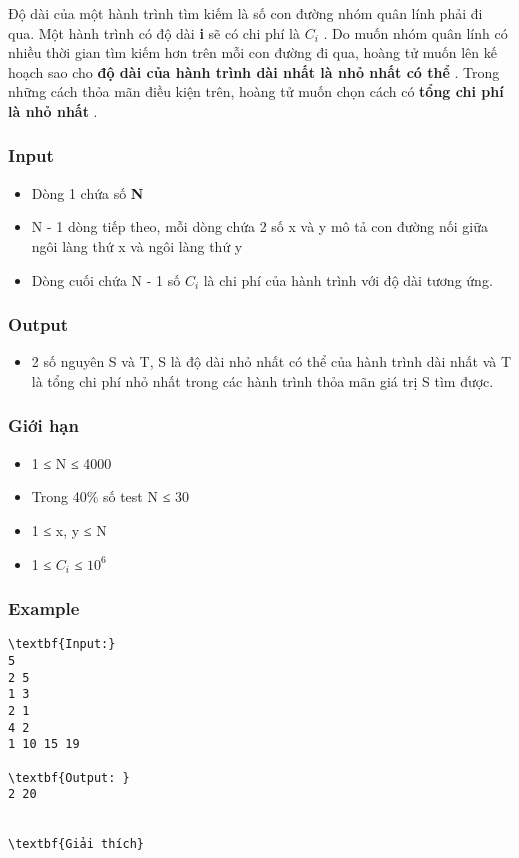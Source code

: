Độ dài của một hành trình tìm kiếm là số con đường nhóm quân lính phải đi qua. Một hành trình có độ dài \textbf{ i } sẽ có chi phí là \textbf{ $C_{i}$} . Do muốn nhóm quân lính có nhiều thời gian tìm kiếm hơn trên mỗi con đường đi qua, hoàng tử muốn lên kế hoạch sao cho \textbf{ độ dài của hành trình dài nhất là nhỏ nhất có thể } . Trong những cách thỏa mãn điều kiện trên, hoàng tử muốn chọn cách có \textbf{ tổng chi phí là nhỏ nhất } .

\subsubsection{Input}
\begin{itemize}
	\item Dòng 1 chứa số \textbf{ N }
	\item N - 1 dòng tiếp theo, mỗi dòng chứa 2 số x và y mô tả con đường nối giữa ngôi làng thứ x và ngôi làng thứ y
	\item Dòng cuối chứa N - 1 số \textbf{ $C_{i}$} là chi phí của hành trình với độ dài tương ứng.
\end{itemize}

\subsubsection{Output}
\begin{itemize}
	\item 2 số nguyên S và T, S là độ dài nhỏ nhất có thể của hành trình dài nhất và T là tổng chi phí nhỏ nhất trong các hành trình thỏa mãn giá trị S tìm được.
\end{itemize}

\subsubsection{Giới hạn}
\begin{itemize}
	\item 1 ≤ N ≤ 4000
	\item Trong 40\% số test N ≤ 30
	\item 1 ≤ x, y ≤ N
	\item 1 ≤ $C_{i}$ ≤ $10^{6}$
\end{itemize}
\begin{itemize}
\end{itemize}

\subsubsection{Example}
\begin{verbatim}
\textbf{Input:}
5
2 5
1 3
2 1
4 2
1 10 15 19

\textbf{Output: }
2 20


\textbf{Giải thích}\end{verbatim}

